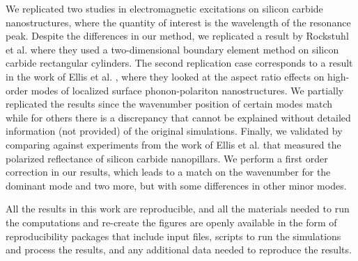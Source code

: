 {We replicated two studies in electromagnetic excitations on silicon carbide nanostructures, where the quantity of interest 
is the wavelength of the resonance peak. Despite the differences in our method, we replicated a result by Rockstuhl et al. \cite{rockstuhl2005}
where they used a two-dimensional boundary element method on silicon carbide rectangular cylinders. The second replication case corresponds to 
a result in the work of Ellis et al. \cite{ellis2016}, where they looked at the aspect ratio effects on high-order modes of
localized surface phonon-polariton nanostructures. We partially replicated the results since the wavenumber position of certain modes match
while for others there is a discrepancy that cannot be explained without detailed information (not provided) of the original simulations. Finally, we
validated \pygbe by comparing against experiments from the work of Ellis et al. \cite{ellis2016} that measured 
the polarized reflectance of silicon carbide nanopillars. We perform a first order correction in our results, which leads to a match on the wavenumber for the 
dominant mode and two more, but with some differences in other minor modes.

All the results in this work are reproducible, and all the materials 
needed to run the computations and re-create the figures are openly available in the form of reproducibility packages 
that include input files, scripts to run the simulations and process the results, and any additional data needed 
to reproduce the results.}
